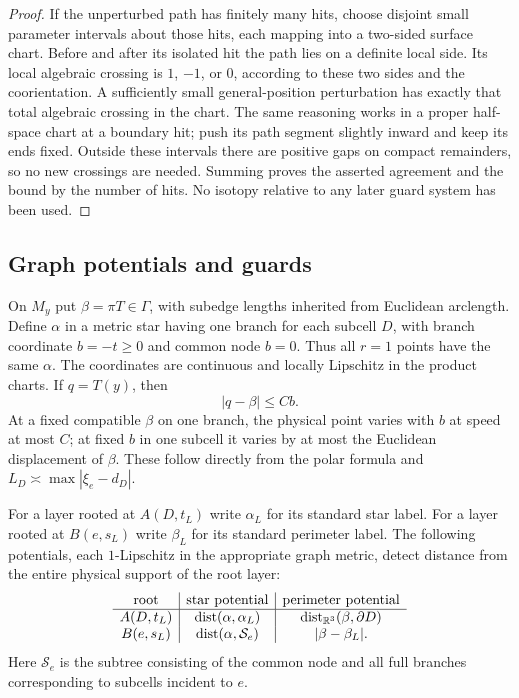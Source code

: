 \documentclass[11pt]{article}
\numberwithin{equation}{section}
\theoremstyle{definition}
\theoremstyle{remark}
\newcommand{\R}{\mathbb R}
\DeclareMathOperator{\dist}{dist}
\begin{document}
\begin{proof}
If the unperturbed path has finitely many hits, choose disjoint small
parameter intervals about those hits, each mapping into a two-sided surface
chart.  Before and after its isolated hit the path lies on a definite local
side.  Its local algebraic crossing is $1$, $-1$, or $0$, according to these
two sides and the coorientation.  A sufficiently small general-position
perturbation has exactly that total algebraic crossing in the chart.  The
same reasoning works in a proper half-space chart at a boundary hit; push
its path segment slightly inward and keep its ends fixed.  Outside these
intervals there are positive gaps on compact remainders, so no new crossings
are needed.  Summing proves the asserted agreement and the bound by the
number of hits.  No isotopy relative to any later guard system has been
used.
\end{proof}


\subsection{Graph potentials and guards}

On $M_y$ put $\beta=\pi T\in\Gamma$, with subedge lengths inherited
from Euclidean arclength.  Define $\alpha$ in a metric star having one
branch for each subcell $D$, with branch coordinate $b=-t\geq0$ and
common node $b=0$.  Thus all $r=1$ points have the same $\alpha$.
The coordinates are continuous and locally Lipschitz in the product
charts.  If $q=T(y)$, then
\begin{equation}\label{wl:graph-physical}
 |q-\beta|\leq Cb.
\end{equation}
At a fixed compatible $\beta$ on one branch, the physical point varies
with $b$ at speed at most $C$; at fixed $b$ in one subcell it varies by
at most the Euclidean displacement of $\beta$.  These follow directly
from the polar formula and $L_D\asymp\max|\xi_e-d_D|$.

For a layer rooted at $A(D,t_L)$ write $\alpha_L$ for its standard
star label.  For a layer rooted at $B(e,s_L)$ write $\beta_L$ for its
standard perimeter label.  The following potentials, each
$1$-Lipschitz in the appropriate graph metric, detect distance from
the entire physical support of the root layer:
\begin{equation}\label{wl:potentials}
\begin{array}{c|c|c}
 \hbox{root}&\hbox{star potential}&\hbox{perimeter potential}\\ \hline
 A(D,t_L)&\dist(\alpha,\alpha_L)&\dist_{\R^3}(\beta,\partial D)\\
 B(e,s_L)&\dist(\alpha,\mathcal S_e)&|\beta-\beta_L|.
\end{array}
\end{equation}
Here $\mathcal S_e$ is the subtree consisting of the common node and
all full branches corresponding to subcells incident to $e$.
\end{document}
